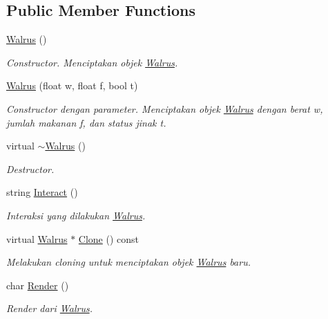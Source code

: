 \subsection*{Public Member Functions}
\begin{DoxyCompactItemize}
\item 
\hyperlink{classWalrus_a75c3d200b57a5c9fbcef9d8dc8247bf3}{Walrus} ()
\begin{DoxyCompactList}\small\item\em Constructor. Menciptakan objek \hyperlink{classWalrus}{Walrus}. \end{DoxyCompactList}\item 
\hyperlink{classWalrus_ad275ac9ac07871be362da7a4e180e68d}{Walrus} (float w, float f, bool t)
\begin{DoxyCompactList}\small\item\em Constructor dengan parameter. Menciptakan objek \hyperlink{classWalrus}{Walrus} dengan berat w, jumlah makanan f, dan status jinak t. \end{DoxyCompactList}\item 
virtual \hyperlink{classWalrus_a0dbf8812cdde2fecc53bee6823ff0119}{$\sim$\+Walrus} ()
\begin{DoxyCompactList}\small\item\em Destructor. \end{DoxyCompactList}\item 
string \hyperlink{classWalrus_aa21a90ecf8aff97c4cf90a59449ce02c}{Interact} ()
\begin{DoxyCompactList}\small\item\em Interaksi yang dilakukan \hyperlink{classWalrus}{Walrus}. \end{DoxyCompactList}\item 
virtual \hyperlink{classWalrus}{Walrus} $\ast$ \hyperlink{classWalrus_a9644eb3d51eb945b716bd37e25c7470e}{Clone} () const 
\begin{DoxyCompactList}\small\item\em Melakukan cloning untuk menciptakan objek \hyperlink{classWalrus}{Walrus} baru. \end{DoxyCompactList}\item 
char \hyperlink{classWalrus_a143f948e4c45e13a67f893caa435475d}{Render} ()
\begin{DoxyCompactList}\small\item\em Render dari \hyperlink{classWalrus}{Walrus}. \end{DoxyCompactList}\end{DoxyCompactItemize}
